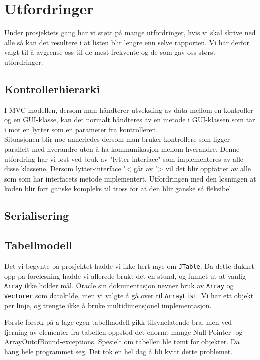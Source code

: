 \section{Utfordringer}
Under prosjektets gang har vi støtt på mange utfordringer, hvis vi skal skrive ned alle så kan det resultere i at listen blir lengre enn selve rapporten. Vi har derfor valgt til å avgrense oss til de mest frekvente og de som gav oss størst utfordringer.

\subsection{Kontrollerhierarki}
I MVC-modellen, dersom man håndterer utveksling av data mellom en kontroller og en GUI-klasse, kan det normalt håndteres av en metode i GUI-klassen som tar i mot en lytter som en parameter fra kontrolleren. \\
Situasjonen blir noe annerledes dersom man bruker kontrollere som ligger parallelt med hverandre uten å ha kommunikasjon mellom hverandre. Denne utfordring har vi løst ved bruk av "lytter-interface" som implementeres av alle disse klassene. Dersom lytter-interface "< går av "> vil det blir oppfattet av alle som som har interfacets metode implementert. Utfordringen med den løsningen at koden blir fort ganske kompleks til tross for at den blir ganske så fleksibel.
\subsection{Serialisering}
\subsection{Tabellmodell}
Det vi begynte på prosjektet hadde vi ikke lært mye om \texttt{JTable}. Da dette dukket opp på forelesning hadde vi allerede brukt det en stund, og funnet ut at vanlig \texttt{Array} ikke holder mål. Oracle sin dokumentasjon nevner bruk av \texttt{Array} og \texttt{Vectorer} som datakilde, men vi valgte å gå over til \texttt{ArrayList}. Vi har ett objekt per linje, og trengte ikke å bruke multidimensjonel implementasjon.

Første forsøk på å lage egen tabellmodell gikk tilsynelatende bra, men ved fjerning av elementer fra tabellen oppstod det enormt mange Null Pointer- og ArrayOutofBound-exceptions. Spesielt om tabellen ble tømt for objekter. Da hang hele programmet seg. Det tok en hel dag å bli kvitt dette problemet. 
